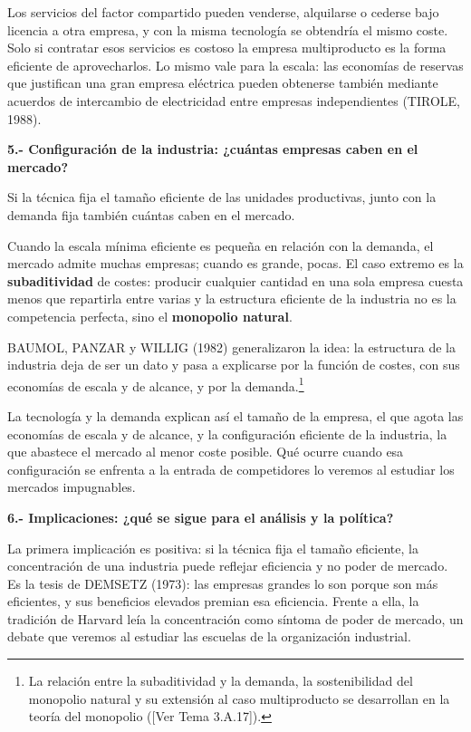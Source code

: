\documentclass[10pt,a4paper]{article}
\newcommand{\authorfont}[1]{{\fontfamily{EBGaramond-TLF}\selectfont #1}}
\begin{document}
Los servicios del factor compartido pueden venderse, alquilarse o cederse bajo licencia a otra empresa, y con la misma tecnología se obtendría el mismo coste. Solo si contratar esos servicios es costoso la empresa multiproducto es la forma eficiente de aprovecharlos. Lo mismo vale para la escala: las economías de reservas que justifican una gran empresa eléctrica pueden obtenerse también mediante acuerdos de intercambio de electricidad entre empresas independientes (TIROLE, 1988).

\textbf{5.- Configuración de la industria: ¿cuántas empresas caben en el mercado?}

Si la técnica fija el tamaño eficiente de las unidades productivas, junto con la demanda fija también cuántas caben en el mercado. 

Cuando la escala mínima eficiente es pequeña en relación con la demanda, el mercado admite muchas empresas; cuando es grande, pocas. El caso extremo es la \textbf{subaditividad} de costes: producir cualquier cantidad en una sola empresa cuesta menos que repartirla entre varias y la estructura eficiente de la industria no es la competencia perfecta, sino el \textbf{monopolio natural}. 

BAUMOL, PANZAR y WILLIG (1982) generalizaron la idea: la estructura de la industria deja de ser un dato y pasa a explicarse por la función de costes, con sus economías de escala y de alcance, y por la demanda.\footnote{%
    La relación entre la subaditividad y la demanda, la sostenibilidad del monopolio natural y su extensión al caso multiproducto se desarrollan en la teoría del monopolio ([\authorfont{Ver Tema 3.A.17}]).
} 

La tecnología y la demanda explican así el tamaño de la empresa, el que agota las economías de escala y de alcance, y la configuración eficiente de la industria, la que abastece el mercado al menor coste posible. Qué ocurre cuando esa configuración se enfrenta a la entrada de competidores lo veremos al estudiar los mercados impugnables.

\textbf{6.- Implicaciones: ¿qué se sigue para el análisis y la política?}

La primera implicación es positiva: si la técnica fija el tamaño eficiente, la concentración de una industria puede reflejar eficiencia y no poder de mercado. Es la tesis de DEMSETZ (1973): las empresas grandes lo son porque son más eficientes, y sus beneficios elevados premian esa eficiencia. Frente a ella, la tradición de Harvard leía la concentración como síntoma de poder de mercado, un debate que veremos al estudiar las escuelas de la organización industrial. 
\end{document}
